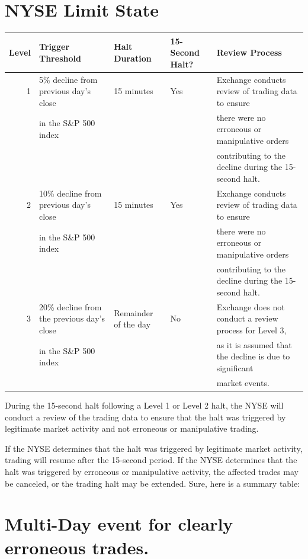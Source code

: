 \documentclass[11pt]{article}
\begin{document}
\section{NYSE Limit State}
\label{sec:org6dcaf51}
\begin{center}
\begin{tabular}{rllll}
Level & Trigger Threshold & Halt Duration & 15-Second Halt? & Review Process\\[0pt]
\hline
1 & 5\% decline from previous day's close & 15 minutes & Yes & Exchange conducts review of trading data to ensure\\[0pt]
 & in the S\&P 500 index &  &  & there were no erroneous or manipulative orders\\[0pt]
 &  &  &  & contributing to the decline during the 15-second halt.\\[0pt]
2 & 10\% decline from previous day's close & 15 minutes & Yes & Exchange conducts review of trading data to ensure\\[0pt]
 & in the S\&P 500 index &  &  & there were no erroneous or manipulative orders\\[0pt]
 &  &  &  & contributing to the decline during the 15-second halt.\\[0pt]
3 & 20\% decline from the previous day's close & Remainder of the day & No & Exchange does not conduct a review process for Level 3,\\[0pt]
 & in the S\&P 500 index &  &  & as it is assumed that the decline is due to significant\\[0pt]
 &  &  &  & market events.\\[0pt]
\end{tabular}
\end{center}

During the 15-second halt following a Level 1 or Level 2 halt,
the NYSE will conduct a review of the trading data to ensure
that the halt was triggered by legitimate market activity and
not erroneous or manipulative trading. 

If the NYSE determines that the halt was triggered by legitimate market activity, trading will resume after the 15-second period. 
If the NYSE determines that the halt was triggered by erroneous or manipulative activity, the affected trades may be canceled, or the trading halt may be extended.
Sure, here is a summary table:

\section{Multi-Day event for clearly erroneous trades.}
\label{sec:orgfbe022f}
\end{document}
